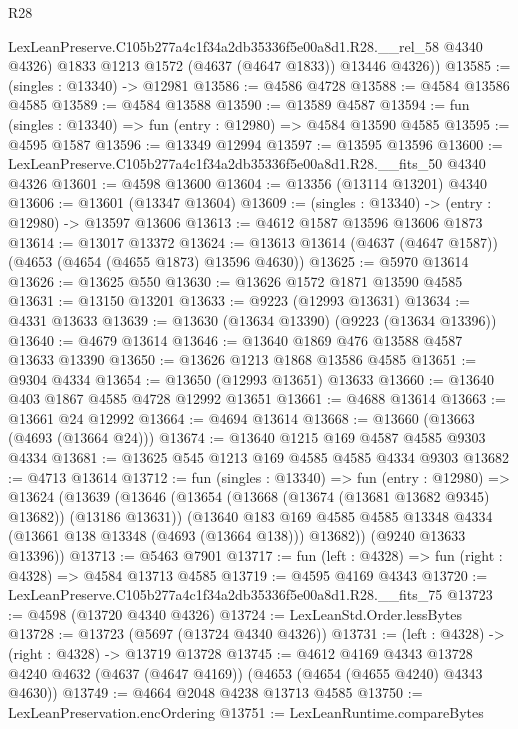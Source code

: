 \begin{lexlean}{R28}
\begin{coremodule}
        LexLeanPreserve.C105b277a4c1f34a2db35336f5e00a8d1.R28.__rel_58 @4340 @4326)
        @1833
        @1213
        @1572
        (@4637 (@4647 @1833))
        @13446
        @4326))
@13585 := (singles : @13340) -> @12981
@13586 := @4586 @4728
@13588 := @4584 @13586 @4585
@13589 := @4584 @13588
@13590 := @13589 @4587
@13594 := fun (singles : @13340) => fun (entry : @12980) => @4584 @13590 @4585
@13595 := @4595 @1587
@13596 := @13349 @12994
@13597 := @13595 @13596
@13600 := LexLeanPreserve.C105b277a4c1f34a2db35336f5e00a8d1.R28.__fits_50 @4340 @4326
@13601 := @4598 @13600
@13604 := @13356 (@13114 @13201) @4340
@13606 := @13601 (@13347 @13604)
@13609 := (singles : @13340) -> (entry : @12980) -> @13597 @13606
@13613 := @4612 @1587 @13596 @13606 @1873
@13614 := @13017 @13372
@13624 := @13613 @13614 (@4637 (@4647 @1587)) (@4653 (@4654 (@4655 @1873) @13596 @4630))
@13625 := @5970 @13614
@13626 := @13625 @550
@13630 := @13626 @1572 @1871 @13590 @4585
@13631 := @13150 @13201
@13633 := @9223 (@12993 @13631)
@13634 := @4331 @13633
@13639 := @13630 (@13634 @13390) (@9223 (@13634 @13396))
@13640 := @4679 @13614
@13646 := @13640 @1869 @476 @13588 @4587 @13633 @13390
@13650 := @13626 @1213 @1868 @13586 @4585
@13651 := @9304 @4334
@13654 := @13650 (@12993 @13651) @13633
@13660 := @13640 @403 @1867 @4585 @4728 @12992 @13651
@13661 := @4688 @13614
@13663 := @13661 @24 @12992
@13664 := @4694 @13614
@13668 := @13660 (@13663 (@4693 (@13664 @24)))
@13674 := @13640 @1215 @169 @4587 @4585 @9303 @4334
@13681 := @13625 @545 @1213 @169 @4585 @4585 @4334 @9303
@13682 := @4713 @13614
@13712 := fun (singles : @13340) =>
  fun (entry : @12980) =>
  @13624
    (@13639
      (@13646
        (@13654 (@13668 (@13674 (@13681 @13682 @9345) @13682)) (@13186 @13631))
        (@13640
          @183
          @169
          @4585
          @4585
          @13348
          @4334
          (@13661 @138 @13348 (@4693 (@13664 @138)))
          @13682))
      (@9240 @13633 @13396))
@13713 := @5463 @7901
@13717 := fun (left : @4328) => fun (right : @4328) => @4584 @13713 @4585
@13719 := @4595 @4169 @4343
@13720 := LexLeanPreserve.C105b277a4c1f34a2db35336f5e00a8d1.R28.__fits_75
@13723 := @4598 (@13720 @4340 @4326)
@13724 := LexLeanStd.Order.lessBytes
@13728 := @13723 (@5697 (@13724 @4340 @4326))
@13731 := (left : @4328) -> (right : @4328) -> @13719 @13728
@13745 := @4612
    @4169
    @4343
    @13728
    @4240
    @4632
    (@4637 (@4647 @4169))
    (@4653 (@4654 (@4655 @4240) @4343 @4630))
@13749 := @4664 @2048 @4238 @13713 @4585
@13750 := LexLeanPreservation.encOrdering
@13751 := LexLeanRuntime.compareBytes

\end{coremodule}
\end{lexlean}
